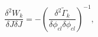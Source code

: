 \begin{equation}
\frac{\delta^2 W_k}{\delta J\delta J}=
-\left(\frac{\delta^2\tilde\Gamma_k}{\delta\phi_{cl}\delta\phi_{cl}}\right)^{-1},
\end{equation}

